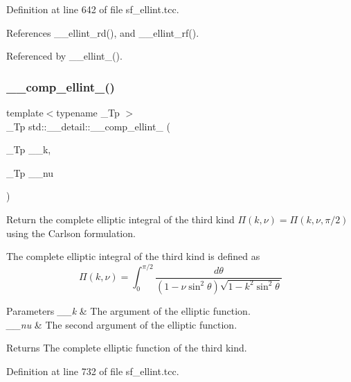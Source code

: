 Definition at line 642 of file sf\+\_\+ellint.\+tcc.



References \+\_\+\+\_\+ellint\+\_\+rd(), and \+\_\+\+\_\+ellint\+\_\+rf().



Referenced by \+\_\+\+\_\+ellint\+\_().

\mbox{\label{namespacestd_1_1____detail_a26b35b5d72366d30ac4644db8f2f8be4}} 
\subsubsection{\texorpdfstring{\+\_\+\+\_\+comp\+\_\+ellint\+\_()}{\_\_comp\_ellint\_3()}}
{\footnotesize\ttfamily template$<$typename \+\_\+\+Tp $>$ \\
\+\_\+\+Tp std\+::\+\_\+\+\_\+detail\+::\+\_\+\+\_\+comp\+\_\+ellint\+\_ (\begin{DoxyParamCaption}\item[{\+\_\+\+Tp}]{\+\_\+\+\_\+k,  }\item[{\+\_\+\+Tp}]{\+\_\+\+\_\+nu }\end{DoxyParamCaption})}



Return the complete elliptic integral of the third kind $ \Pi(k,\nu) = \Pi(k,\nu,\pi/2) $ using the Carlson formulation. 

The complete elliptic integral of the third kind is defined as \[ \Pi(k,\nu) = \int_0^{\pi/2} \frac{d\theta} {(1 - \nu \sin^2\theta)\sqrt{1 - k^2 \sin^2\theta}} \]


\begin{DoxyParams}{Parameters}
{\em \+\_\+\+\_\+k} & The argument of the elliptic function. \\
\hline
{\em \+\_\+\+\_\+nu} & The second argument of the elliptic function. \\
\hline
\end{DoxyParams}
\begin{DoxyReturn}{Returns}
The complete elliptic function of the third kind. 
\end{DoxyReturn}


Definition at line 732 of file sf\+\_\+ellint.\+tcc.



